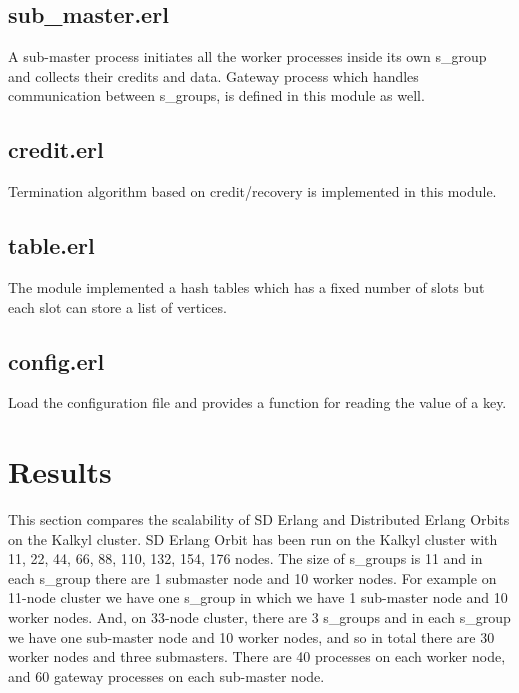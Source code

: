 \documentclass[11pt,a4paper]{article}
\begin{document}
\subsection*{sub\_master.erl}
A sub-master process initiates all the worker processes inside its own s\_group and collects their credits and data. Gateway process which handles communication between s\_groups, is defined in this module as well.

\subsection*{credit.erl}
Termination algorithm based on credit/recovery is implemented in this module. 

\subsection*{table.erl}
The module implemented a hash tables which has a fixed number of slots but each slot can store a list of vertices. 

\subsection*{config.erl}
Load the configuration file and provides a function for reading the value of a key. 

\section{Results}
This section compares the scalability of SD Erlang and Distributed Erlang Orbits on the Kalkyl cluster. SD Erlang Orbit has been run on the Kalkyl cluster with 11, 22, 44, 66, 88, 110, 132, 154,  176 nodes. The size of s\_groups is 11 and in each s\_group there are 1 submaster node and 10 worker nodes. For example on 11-node cluster we have one s\_group in which we have 1 sub-master node and 10 worker nodes. And, on 33-node cluster, there are 3 s\_groups and in each s\_group we have one sub-master node and 10 worker nodes, and so in total there are 30 worker nodes and three submasters.
There are 40 processes on each worker node, and 60 gateway processes on each sub-master node.
\end{document}
